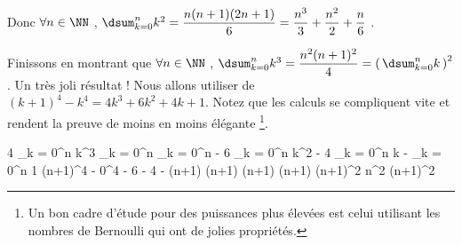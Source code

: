 \medskip

Donc
$\forall n \in \NN$ , $\dsum_{k = 0}^{n} k^2 = \dfrac{n(n + 1)(2n + 1)}{6} = \dfrac{n^3}{3} + \dfrac{n^2}{2} + \dfrac{n}{6}$ .


\medskip

Finissons en montrant que
$\forall n \in \NN$ , $\dsum_{k = 0}^{n} k^3 = \dfrac{n^2 (n + 1)^2}{4} = \left( \, \dsum_{k = 0}^{n} k \, \right)^2$ . Un très joli résultat !
Nous allons utiliser de $(k+1)^4 - k^4 = 4 k^3 + 6 k^2 + 4 k + 1$.
Notez que les calculs se compliquent vite et rendent la preuve de moins en moins élégante
\footnote{
	Un bon cadre d'étude pour des puissances plus élevées est celui utilisant les nombres de Bernoulli qui ont de jolies propriétés.
}.

\medskip

\begin{explain}[style = sar]
	4 \dsum_{k = 0}^{n} k^3
		\explnext{}
	\dsum_{k = 0}^{n} \big[ \, (k+1)^4 - k^4 - 6 k^2 - 4 k - 1 \, \big]
		\explnext{}
	\dsum_{k = 0}^{n} \big[ \, (k+1)^4 - k^4 \, \big] - 6 \dsum_{k = 0}^{n} k^2 - 4 \dsum_{k = 0}^{n} k - \dsum_{k = 0}^{n} 1
		\explnext{}
	(n+1)^4 - 0^4 - 6 \cdot {} - 4 \cdot {} - (n+1)
		\explnext{}
	(n+1) \cdot \big[ \, (n+1)^3 - n(2n + 1) - 2n - 1 \, \big]
		\explnext{}
	(n+1) \cdot \big[ \, (n+1)^3 - 2n^2 - 3n - 1 \, \big]
	(n+1) \cdot \big[ \, (n+1)^3 - (n+1)(2n + 1) \, \big]
		\explnext{}
	(n+1)^2 \cdot \big[ \, (n+1)^2 - 2n - 1 \, \big]
		\explnext{}
	n^2 (n+1)^2
\end{explain}



